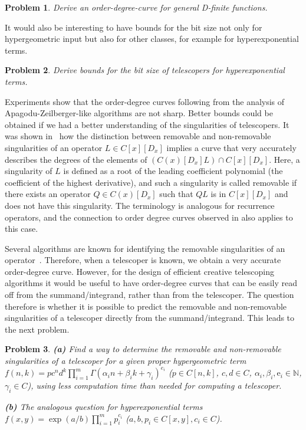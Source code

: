 \documentclass[a4paper,draft]{amsart}
\let\set\mathbb
\def\e{\mathrm{e}}
\newtheorem{problem}{Problem}
\begin{document}
 \begin{problem}
   Derive an order-degree-curve for general D-finite functions.
 \end{problem}

 It would also be interesting to have bounds for the bit size not only for hypergeometric input but also for
 other classes, for example for hyperexponential terms.

 \begin{problem}
   Derive bounds for the bit size of telescopers for hyperexponential terms.
 \end{problem}

 Experiments show that the order-degree curves following from the analysis of Apagodu-Zeilberger-like algorithms
 are not sharp. Better bounds could be obtained if we had a better understanding of the singularities of
 telescopers. It was shown in~\cite{jaroschek13a} how the distinction between removable and non-removable singularities of
 an operator $L\in C[x][D_x]$ implies a curve that very accurately describes the degrees of the elements of
 $(C(x)[D_x]L)\cap C[x][D_x]$. Here, a singularity of $L$ is defined as a root of the leading coefficient
 polynomial (the coefficient of the highest derivative), and such a singularity is called removable if there
 exists an operator $Q\in C(x)[D_x]$ such that $QL$ is in $C[x][D_x]$ and does not have this singularity.
 The terminology is analogous for recurrence operators, and the connection to order degree curves observed
 in \cite{jaroschek13a} also applies to this case.

 Several algorithms are known for identifying the removable singularities of an operator~\cite{abramov99b,abramov06a,chen15b}.
 Therefore, when a telescoper is known, we obtain a very accurate order-degree curve.
 However, for the design of efficient creative telescoping algorithms it would be useful to have order-degree
 curves that can be easily read off from the summand/integrand, rather than from the telescoper.
 The question therefore is whether it is possible to predict the removable and non-removable singularities
 of a telescoper directly from the summand/integrand. This leads to the next problem.

 \begin{problem} \textbf{\emph{(a)}}
   Find a way to determine the removable and non-removable singularities of a telescoper for a given proper
   hypergeometric term $f(n,k)=p c^n d^k \prod_{i=1}^m \Gamma(\alpha_i n+\beta_i k+\gamma_i)^{e_i}$
   ($p\in C[n,k]$, $c,d\in C$, $\alpha_i,\beta_i,\e_i\in\set N$, $\gamma_i\in C$),
   using less computation time than needed for computing a telescoper.

   \textbf{\emph{(b)}} The analogous question for hyperexponential terms $f(x,y)=\exp(a/b)\prod_{i=1}^m p_i^{c_i}$
   ($a,b,p_i\in C[x,y],c_i\in C$).
 \end{problem}
\end{document}
